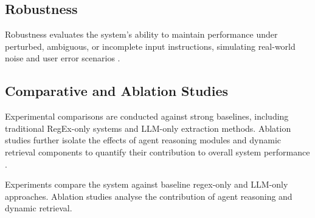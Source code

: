 \subsection{Robustness}
Robustness evaluates the system’s ability to maintain performance under perturbed, ambiguous, or incomplete input instructions, simulating real-world noise and user error scenarios \cite{Jia2017AdversarialExamples}.

\subsection{Comparative and Ablation Studies}
Experimental comparisons are conducted against strong baselines, including traditional RegEx-only systems and LLM-only extraction methods. Ablation studies further isolate the effects of agent reasoning modules and dynamic retrieval components to quantify their contribution to overall system performance \cite{Lewis2020RetrievalAugmentedGeneration}.

Experiments compare the system against baseline regex-only and LLM-only approaches. Ablation studies analyse the contribution of agent reasoning and dynamic retrieval.











